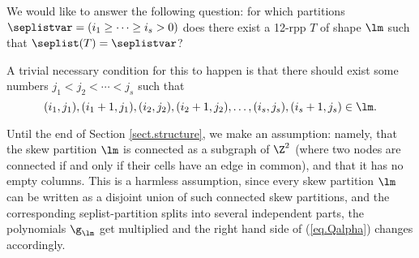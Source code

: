\documentclass[numbers=enddot,12pt,final,onecolumn,notitlepage]{scrartcl}%
\theoremstyle{definition}
\begin{document}
We would like to answer the following question: for which partitions $\seplistvar=(i_1\geq \cdots\geq i_s>0)$ does there exist a 12-rpp $T$ of shape $\lm$ such that $\seplist(T)=\seplistvar$?

A trivial necessary condition for this to happen is that there should exist some numbers $j_1<j_2<\cdots<j_s$ such that 
\begin{equation}\label{cond:necessary}
(i_1,j_1),(i_1+1,j_1),(i_2,j_2),(i_2+1,j_2),\dots,(i_s,j_s),(i_s+1,j_s)\in \lm. 
\end{equation}

Until the end of Section \ref{sect.structure}, we make an
assumption: namely, that the skew partition $\lm$ is
connected as a subgraph of $\Z^2$ (where two nodes are connected
if and only if their cells have an edge in common), and that
it has no empty columns. This is a harmless assumption,
since every skew partition $\lm$ can be written as a disjoint union
of such connected skew partitions, and the corresponding
seplist-partition splits into several independent parts, the
polynomials $\g_\lm$ get multiplied and the right hand side of
(\ref{eq.Qalpha}) changes accordingly. 

\begin{comment}
 
\footnote{By this, we mean that $\lm$ has at least one
cell, and cannot be represented
as a disjoint union of two nonempty skew partitions $\alpha/\beta$
and $\gamma/\delta$ such that no cell of $\alpha/\beta$ is adjacent
to any cell of $\gamma/\delta$. This is a harmless assumption,
since every skew partition $\lm$ can be written as a disjoint union
of such connected skew partitions, and these ``connected
components'' do not interact when it comes to studying rpps:
Choosing a 12-rpp of shape $\lm$ is tantamount to choosing
a 12-rpp for each of these components; and choosing a 12-rpp of
shape $\lm$ with seplist-partition equal to a given partition
$\seplistvar$ is tantamount to choosing a 12-rpp for each of the
components with seplist-partition equal to the ``appropriate piece''
of $\seplistvar$. (What an ``appropriate piece'' is should be
clear enough, since two distinct connected components are supported
on different rows.)}.

\end{comment}

\newcommand{\nuxy}[2]{\seplistvar\big|_{\subseteq[#1,#2)}}
\newcommand{\nuxycap}[2]{\seplistvar\big|_{\cap[#1,#2)}}
\newcommand{\nupxy}[2]{\seplistvar^{\prime}\big|_{\subseteq[#1,#2)}}
\end{document}
